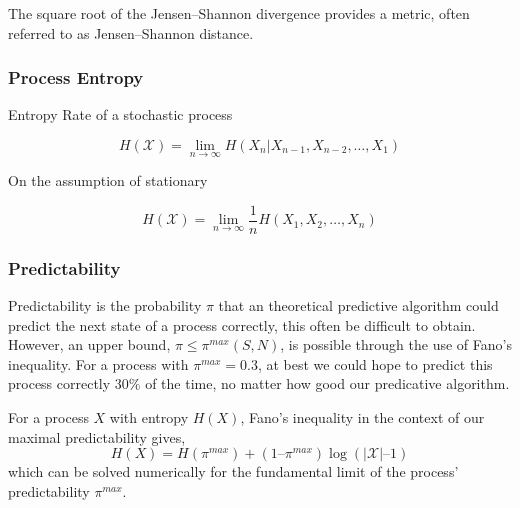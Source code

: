 \begin{remark}
	The square root of the Jensen–Shannon divergence provides a metric, often referred to as Jensen–Shannon distance.
\end{remark}


\subsubsection{Process Entropy}


Entropy Rate of a stochastic process

\begin{equation}
H(\mathcal{X})=\lim _{n \rightarrow \infty} H\left(X_{n} | X_{n-1}, X_{n-2}, \ldots, X_{1}\right)
\end{equation}

On the assumption of stationary

\begin{equation}
H(\mathcal{X})=\lim _{n \rightarrow \infty} \frac{1}{n} H\left(X_{1}, X_{2}, \ldots, X_{n}\right)
\end{equation}

\subsubsection{Predictability}

Predictability is the probability $\pi$ that an theoretical predictive algorithm could predict the next state of a process correctly, this often be difficult to obtain. However, an upper bound, $\pi \leq \pi^{max}(S,N)$, is possible through the use of Fano's inequality. For a process with $\pi^{max} = 0.3$, at best we could hope to predict this process correctly 30\% of the time, no matter how good our predicative algorithm. 

\begin{definition}
For a process $X$ with entropy $H(X)$, Fano's inequality in the context of our maximal predictability gives,
\begin{equation}
H(X) = H(\pi^{max}) + (1 – \pi^{max}) \log (|\mathcal{X}| – 1)
\end{equation}
which can be solved numerically for the fundamental limit of the process' predictability $\pi^{max}$.
\end{definition}






